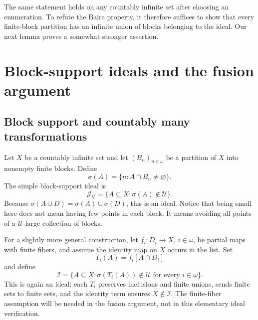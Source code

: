 \documentclass[11pt,a4paper]{article}
\theoremstyle{definition}
\theoremstyle{remark}
\newcommand{\I}{\mathcal I}
\newcommand{\J}{\mathcal J}
\newcommand{\U}{\mathcal U}
\newcommand{\supp}{\sigma}
\begin{document}
The same statement holds on any countably infinite set after choosing an
enumeration. To refute the Baire property, it therefore suffices to show
that every finite-block partition has an infinite union of blocks
belonging to the ideal. Our next lemma proves a somewhat stronger
assertion.

\section{Block-support ideals and the fusion argument}
\label{sec:fusion}

\subsection{Block support and countably many transformations}
Let $X$ be a countably infinite set and let $(B_n)_{n\in\omega}$ be a
partition of $X$ into nonempty finite blocks. Define
\begin{equation}
\label{eq:support}
              \supp(A)=\{n:A\cap B_n\ne\varnothing\}.
\end{equation}
The simple block-support ideal is
\[
              \J_\U=\{A\subseteq X:\supp(A)\notin\U\}.
\]
Because $\supp(A\cup D)=\supp(A)\cup\supp(D)$, this is an ideal.
Notice that being small here does not mean having few points in each
block. It means avoiding all points of a $\U$-large collection of
blocks.

For a slightly more general construction, let
$f_i:D_i\to X$, $i\in\omega$, be partial maps with finite fibers, and
assume the identity map on $X$ occurs in the list. Set
\[
              T_i(A)=f_i[A\cap D_i]
\]
and define
\begin{equation}
\label{eq:generalideal}
 \I=\{A\subseteq X:\supp(T_i(A))\notin\U
                               \text{ for every }i\in\omega\}.
\end{equation}
This is again an ideal: each $T_i$ preserves inclusions and finite
unions, sends finite sets to finite sets, and the identity term ensures
$X\notin\I$. The finite-fiber assumption will be needed in the fusion
argument, not in this elementary ideal verification.
\end{document}
